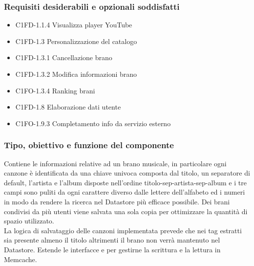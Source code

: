 \subsubsection*{Requisiti desiderabili e opzionali soddisfatti}
\begin{itemize}
    \item C1FD-1.1.4 Visualizza player YouTube
    \item C1FD-1.3 Personalizzazione del catalogo
    \item C1FD-1.3.1 Cancellazione brano
    \item C1FD-1.3.2 Modifica informazioni brano
    \item C1FO-1.3.4 Ranking brani
    \item C1FD-1.8 Elaborazione dati utente
    \item C1FO-1.9.3 Completamento info da servizio esterno
\end{itemize}
\subsubsection*{Tipo, obiettivo e funzione del componente} Contiene le
informazioni relative ad un brano musicale, in particolare ogni canzone \`e
identificata da una chiave univoca composta dal titolo, un separatore di
default, l'artista e l'album disposte nell'ordine titolo-sep-artista-sep-album
e i tre campi sono puliti da ogni carattere diverso dalle lettere dell'alfabeto
ed i numeri in modo da rendere la ricerca nel Datastore pi\`u efficace
possibile. Dei brani condivisi da pi\`u utenti viene salvata una sola copia per ottimizzare
la quantit\`a di spazio utilizzato.\\ 
La logica di salvataggio delle canzoni implementata prevede che nei tag estratti
sia presente almeno il titolo altrimenti il brano non verr\`a mantenuto nel
Datastore. 
Estende le interfacce 
e  per gestirne la scrittura e la
lettura in Memcache.
